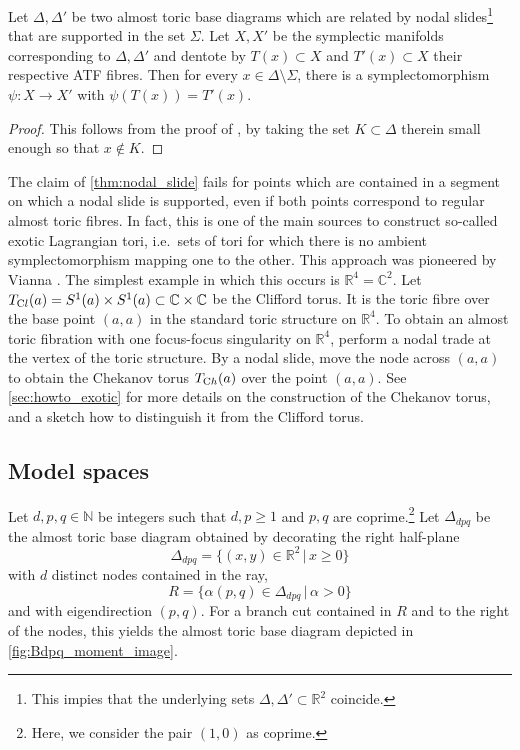 \documentclass[12pt,a4paper,abstract=true,draft]{scrartcl}
\begin{document}
\begin{lemma}
    \label{thm:nodal_slide}
    Let $\Delta, \Delta'$ be two almost toric base diagrams which are related by nodal slides\footnote{This impies that the underlying sets $\Delta, \Delta' \subset \mathbb{R}^2$ coincide.} that are supported in the set $\Sigma$.
Let $X,X'$ be the symplectic manifolds corresponding to $\Delta,\Delta'$ and dentote by $T(x) \subset X$ and $T'(x) \subset X$ their respective ATF fibres.
Then for every $x \in \Delta \setminus \Sigma$, there is a symplectomorphism $\psi \colon X \rightarrow X'$ with $\psi(T(x)) = T'(x)$.
\end{lemma}

\begin{proof}
    This follows from the proof of \cite[Theorem 8.10]{evans2021atfs}, by taking the set $K \subset \Delta$ therein small enough so that $x \notin K$.
\end{proof}

\begin{remark}
    \label{rk:slides_ray}
    The claim of \cref{thm:nodal_slide} fails for points which are contained in a segment on which a nodal slide is supported, even if both points correspond to regular almost toric fibres.
In fact, this is one of the main sources to construct so-called exotic Lagrangian tori, i.e.\ sets of tori for which there is no ambient symplectomorphism mapping one to the other.
This approach was pioneered by Vianna \cite{Via16,Via17}.
The simplest example in which this occurs is $\mathbb{R}^4 = \mathbb{C}^2$.
Let $T_{\text Cl}(a) = S^1(a) \times S^1(a) \subset \mathbb{C} \times \mathbb{C}$ be the Clifford torus.
It is the toric fibre over the base point $(a,a)$ in the standard toric structure on $\mathbb{R}^4$.
To obtain an almost toric fibration with one focus-focus singularity on $\mathbb{R}^4$, perform a nodal trade at the vertex of the toric structure.
By a nodal slide, move the node across $(a,a)$ to obtain the Chekanov torus $T_{\text Ch}(a)$ over the point $(a,a)$.
See \cref{sec:howto_exotic} for more details on the construction of the Chekanov torus, and a sketch how to distinguish it from the Clifford torus.
\end{remark}


\subsection{Model spaces}
\label{sec:modelspaces}

Let $d,p,q \in \mathbb{N}$ be integers such that $d,p≥1$ and $p,q$ are coprime.\footnote{Here, we consider the pair $(1,0)$ as coprime.}
Let $\Delta_{dpq}$ be the almost toric base diagram obtained by decorating the right half-plane
$$\Delta_{dpq} = \{ (x,y) \in \mathbb{R}^2 \, \vert \, x ≥ 0 \}$$
with $d$ distinct nodes contained in the ray,
\begin{equation}
  \label{eqn:eigenline}
  R = \{\alpha (p,q) \in \Delta_{dpq} \, \vert \, \alpha > 0 \}
\end{equation}
and with eigendirection $(p,q)$.
For a branch cut contained in $R$ and to the right of the nodes, this yields the almost toric base diagram depicted in \cref{fig:Bdpq_moment_image}.
\end{document}
